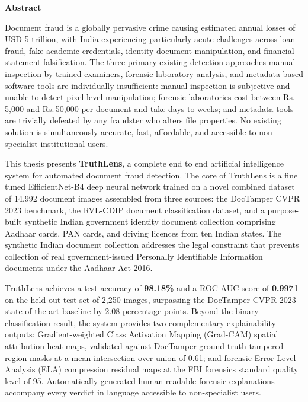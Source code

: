 \documentclass[12pt,a4paper,oneside]{report}
\newcommand{\rupee}{Rs.\,}
\begin{document}
\newpage\thispagestyle{plain}
\begin{center}{\Large\bfseries Abstract}\end{center}\vspace{0.5cm}

\noindent Document fraud is a globally pervasive crime causing estimated annual
losses of USD 5 trillion, with India experiencing particularly acute challenges
across loan fraud, fake academic credentials, identity document manipulation,
and financial statement falsification. The three primary existing detection
approaches manual inspection by trained examiners, forensic laboratory
analysis, and metadata-based software tools are individually insufficient:
manual inspection is subjective and unable to detect pixel level manipulation;
forensic laboratories cost between \rupee 5,000 and \rupee 50,000 per document
and take days to weeks; and metadata tools are trivially defeated by any
fraudster who alters file properties. No existing solution is simultaneously
accurate, fast, affordable, and accessible to non-specialist institutional users.

\vspace{6pt}\noindent This thesis presents \textbf{TruthLens}, a complete
end to end artificial intelligence system for automated document fraud detection.
The core of TruthLens is a fine tuned EfficientNet-B4 deep neural network
trained on a novel combined dataset of 14,992 document images assembled from
three sources: the DocTamper CVPR 2023 benchmark, the RVL-CDIP document
classification dataset, and a purpose-built synthetic Indian government
identity document collection comprising Aadhaar cards, PAN cards, and driving
licences from ten Indian states. The synthetic Indian document collection
addresses the legal constraint that prevents collection of real government-issued
Personally Identifiable Information documents under the Aadhaar Act 2016.

\vspace{6pt}\noindent TruthLens achieves a test accuracy of \textbf{98.18\%}
and a ROC-AUC score of \textbf{0.9971} on the held out test set of 2,250 images,
surpassing the DocTamper CVPR 2023 state-of-the-art baseline by 2.08 percentage
points. Beyond the binary classification result, the system provides two
complementary explainability outputs: Gradient-weighted Class Activation Mapping
(Grad-CAM) spatial attribution heat maps, validated against DocTamper ground-truth
tampered region masks at a mean intersection-over-union of 0.61; and forensic
Error Level Analysis (ELA) compression residual maps at the FBI forensics
standard quality level of 95. Automatically generated human-readable forensic
explanations accompany every verdict in language accessible to non-specialist
users.
\end{document}
